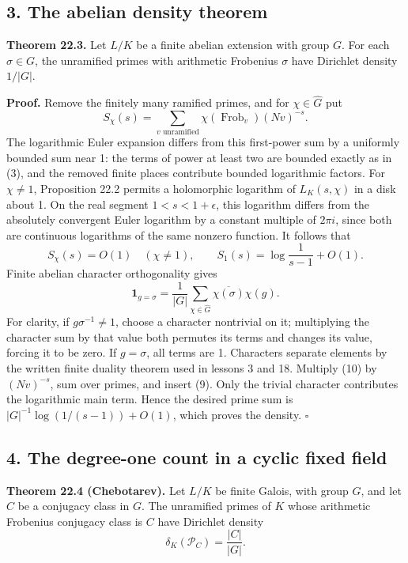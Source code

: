 \documentclass[11pt,a4paper]{article}
\begin{document}
\subsection{3. The abelian density
theorem}\label{the-abelian-density-theorem}

\textbf{Theorem 22.3.} Let \(L/K\) be a finite abelian extension with
group \(G\). For each \(\sigma\in G\), the unramified primes with
arithmetic Frobenius \(\sigma\) have Dirichlet density \(1/|G|\).

\textbf{Proof.} Remove the finitely many ramified primes, and for
\(\chi\in\widehat G\) put \[
S_\chi(s)=\sum_{v\text{ unramified}}\chi(\operatorname{Frob}_v)(Nv)^{-s}.
\tag{8}
\] The logarithmic Euler expansion differs from this first-power sum by
a uniformly bounded sum near 1: the terms of power at least two are
bounded exactly as in (3), and the removed finite places contribute
bounded logarithmic factors. For \(\chi\ne1\), Proposition 22.2 permits
a holomorphic logarithm of \(L_K(s,\chi)\) in a disk about 1. On the
real segment \(1<s<1+\epsilon\), this logarithm differs from the
absolutely convergent Euler logarithm by a constant multiple of
\(2\pi i\), since both are continuous logarithms of the same nonzero
function. It follows that \[
S_\chi(s)=O(1)\quad(\chi\ne1),\qquad
S_1(s)=\log\frac1{s-1}+O(1).
\tag{9}
\] Finite abelian character orthogonality gives \[
\mathbf1_{g=\sigma}=\frac1{|G|}\sum_{\chi\in\widehat G}
\overline{\chi(\sigma)}\chi(g).
\tag{10}
\] For clarity, if \(g\sigma^{-1}\ne1\), choose a character nontrivial
on it; multiplying the character sum by that value both permutes its
terms and changes its value, forcing it to be zero. If \(g=\sigma\), all
terms are 1. Characters separate elements by the written finite duality
theorem used in lessons 3 and 18. Multiply (10) by \((Nv)^{-s}\), sum
over primes, and insert (9). Only the trivial character contributes the
logarithmic main term. Hence the desired prime sum is
\(|G|^{-1}\log(1/(s-1))+O(1)\), which proves the density. \(\square\)

\subsection{4. The degree-one count in a cyclic fixed
field}\label{the-degree-one-count-in-a-cyclic-fixed-field}

\textbf{Theorem 22.4 (Chebotarev).} Let \(L/K\) be finite Galois, with
group \(G\), and let \(C\) be a conjugacy class in \(G\). The unramified
primes of \(K\) whose arithmetic Frobenius conjugacy class is \(C\) have
Dirichlet density \[
\delta_K(\mathcal P_C)=\frac{|C|}{|G|}.
\tag{11}
\]
\end{document}
